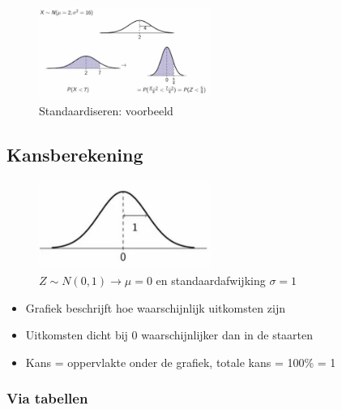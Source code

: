 \documentclass{article}
\begin{document}
\begin{figure}[H]
    \centering
    \includegraphics[width=0.5\textwidth]{standardizering-voorbeeld.png}
    \caption{Standaardiseren: voorbeeld}
\end{figure}

\subsection{Kansberekening}

\begin{figure}[H]
    \centering
    \includegraphics[width=0.5\textwidth]{normaalverdeling-kansen.png}
    \caption{$Z \sim N(0, 1) \rightarrow \mu = 0$ en standaardafwijking $\sigma = 1$}
\end{figure}

\begin{itemize}
    \item Grafiek beschrijft hoe waarschijnlijk uitkomsten zijn
    \item Uitkomsten dicht bij 0 waarschijnlijker dan in de staarten
    \item Kans = oppervlakte onder de grafiek, totale kans = 100\% = 1
\end{itemize}

\subsubsection{Via tabellen}
\end{document}
